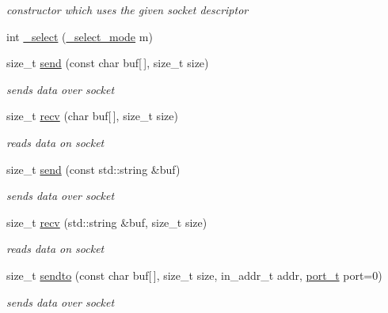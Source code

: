 \begin{CompactItemize}
\begin{CompactItemize}
\begin{CompactList}\small\item\em constructor which uses the given socket descriptor \item\end{CompactList}\item 
int \hyperlink{classsocketpp_1_1BaseSocket_9c925091102c9371be9990fedd605f1c}{\_\-select} (\hyperlink{classsocketpp_1_1BaseSocket_21492d478c5aa2ff8a1ad258ccf58062}{\_\-select\_\-mode} m)
\item 
size\_\-t \hyperlink{classsocketpp_1_1BaseSocket_bf4e15b88271e34e606b9b2a5b384b5b}{send} (const char buf\mbox{[}$\,$\mbox{]}, size\_\-t size)
\begin{CompactList}\small\item\em sends data over socket \item\end{CompactList}\item 
size\_\-t \hyperlink{classsocketpp_1_1BaseSocket_08b3e29d019575293fa134c6d91d6cbb}{recv} (char buf\mbox{[}$\,$\mbox{]}, size\_\-t size)
\begin{CompactList}\small\item\em reads data on socket \item\end{CompactList}\item 
size\_\-t \hyperlink{classsocketpp_1_1BaseSocket_fb896f016a243ddbb661acc7b05826bf}{send} (const std::string \&buf)
\begin{CompactList}\small\item\em sends data over socket \item\end{CompactList}\item 
size\_\-t \hyperlink{classsocketpp_1_1BaseSocket_25fc62d259f6d12f1b1a5001a7512897}{recv} (std::string \&buf, size\_\-t size)
\begin{CompactList}\small\item\em reads data on socket \item\end{CompactList}\item 
size\_\-t \hyperlink{classsocketpp_1_1BaseSocket_33ef257bb6eb0f23ae0680df57738f3a}{sendto} (const char buf\mbox{[}$\,$\mbox{]}, size\_\-t size, in\_\-addr\_\-t addr, \hyperlink{namespacesocketpp_5517ef80f249b891a2ba64b95fc1e723}{port\_\-t} port=0)
\begin{CompactList}\small\item\em sends data over socket \item\end{CompactList}\item 

\end{CompactItemize}
\end{CompactItemize}

